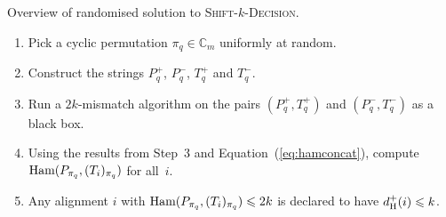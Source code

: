 \documentclass[11pt]{article}
\renewcommand{\leq}{\leqslant}
\newcommand{\ham}{\ensuremath{\textup{Ham}}}
\newcommand{\Fam}{\ensuremath{\mathbb{C}_m}}
\newcommand{\DsHam}{\ensuremath{d_\textup{H}^+}}
\newcommand{\skDecision}{\textsc{Shift-$k$-Decision}\xspace}
\newcommand{\dHam}{\DsHam}
\theoremstyle{plain}
\theoremstyle{definition}
\begin{document}
\begin{algorithm}[t]
    \caption{Overview of randomised solution to \skDecision.
        \label{alg:random}}
    \begin{enumerate}
        \item Pick a cyclic permutation $\pi_q \in \Fam$ uniformly at random.
        \item Construct the strings $P^+_q$, $P^-_q$, $T^+_q$ and $T^-_q$.
        \item Run a $2k$-mismatch algorithm on the pairs $(P^+_q,T^+_q)$ and $(P^-_q,T^-_q)$ as a black box.
        \item Using the results from Step~3 and Equation~(\ref{eq:hamconcat}), compute $\ham(P_{\pi_q},(T_i)_{\pi_q})$ for all~$i$.
        \item Any alignment $i$ with $\ham(P_{\pi_q},(T_i)_{\pi_q}) \leq 2k$ is declared to have $\dHam(i) \leq k$.
    \end{enumerate}
    \vspace{-8pt}
\end{algorithm}
\end{document}
